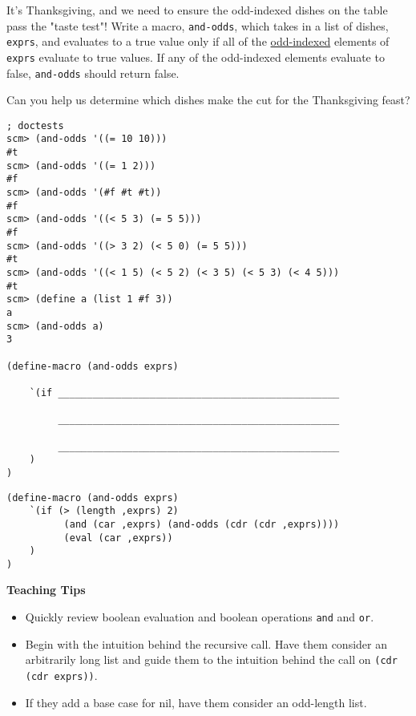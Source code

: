 \question
It's Thanksgiving, and we need to ensure the odd-indexed dishes on the table pass the "taste test"! Write a macro, \lstinline{and-odds}, which takes in a list of dishes, \lstinline{exprs}, and evaluates to a true value only if all of the \underline{odd-indexed} elements of \lstinline{exprs} evaluate to true values. If any of the odd-indexed elements evaluate to false, \lstinline{and-odds} should return false.

Can you help us determine which dishes make the cut for the Thanksgiving feast?

\begin{lstlisting}
; doctests
scm> (and-odds '((= 10 10)))
#t
scm> (and-odds '((= 1 2)))
#f
scm> (and-odds '(#f #t #t))
#f
scm> (and-odds '((< 5 3) (= 5 5)))
#f
scm> (and-odds '((> 3 2) (< 5 0) (= 5 5)))
#t
scm> (and-odds '((< 1 5) (< 5 2) (< 3 5) (< 5 3) (< 4 5)))
#t
scm> (define a (list 1 #f 3))
a
scm> (and-odds a)
3

(define-macro (and-odds exprs)

    `(if _________________________________________________

         _________________________________________________

         _________________________________________________
    )
)
\end{lstlisting}

\begin{solution}
\begin{lstlisting}
(define-macro (and-odds exprs)
    `(if (> (length ,exprs) 2)
          (and (car ,exprs) (and-odds (cdr (cdr ,exprs))))
          (eval (car ,exprs))
    )
)
\end{lstlisting}
\end{solution}

\begin{blocksection}
\begin{guide}
\textbf{Teaching Tips}
\begin{itemize}
	\item Quickly review boolean evaluation and boolean operations \lstinline{and} and \lstinline{or}.
	\item Begin with the intuition behind the recursive call. Have them consider an arbitrarily long list and guide them to the intuition behind the call on \lstinline{(cdr (cdr exprs))}.
	\item If they add a base case for nil, have them consider an odd-length list.
\end{itemize}
\end{guide}
\end{blocksection}
